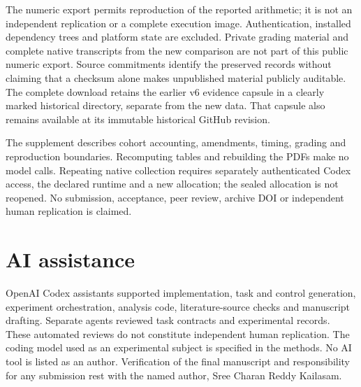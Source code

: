 \documentclass[manuscript,screen,nonacm]{acmart}
\begin{document}
The numeric export permits reproduction of the reported arithmetic; it
is not an independent replication or a complete execution image.
Authentication, installed dependency trees and platform state are
excluded. Private grading material and complete native transcripts from
the new comparison are not part of this public numeric export. Source
commitments identify the preserved records without claiming that a
checksum alone makes unpublished material publicly auditable. The
complete download retains the earlier v6 evidence capsule in a clearly
marked historical directory, separate from the new data. That capsule
also remains available at its immutable historical GitHub revision.

The supplement describes cohort accounting, amendments, timing, grading
and reproduction boundaries. Recomputing tables and rebuilding the PDFs
make no model calls. Repeating native collection requires separately
authenticated Codex access, the declared runtime and a new allocation;
the sealed allocation is not reopened. No submission, acceptance, peer
review, archive DOI or independent human replication is claimed.

\section{AI assistance}\label{ai-assistance}

OpenAI Codex assistants supported implementation, task and control
generation, experiment orchestration, analysis code, literature-source
checks and manuscript drafting. Separate agents reviewed task contracts
and experimental records. These automated reviews do not constitute
independent human replication. The coding model used as an experimental
subject is specified in the methods. No AI tool is listed as an author.
Verification of the final manuscript and responsibility for any
submission rest with the named author, Sree Charan Reddy Kailasam.


\end{document}
